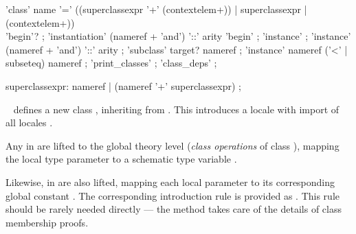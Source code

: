 \begin{isabellebody}
\begin{isamarkuptext}
  \begin{rail}
    'class' name '=' ((superclassexpr '+' (contextelem+)) | superclassexpr | (contextelem+)) \\
      'begin'?
    ;
    'instantiation' (nameref + 'and') '::' arity 'begin'
    ;
    'instance'
    ;
    'instance' (nameref + 'and') '::' arity
    ;
    'subclass' target? nameref
    ;
    'instance' nameref ('<' | subseteq) nameref
    ;
    'print\_classes'
    ;
    'class\_deps'
    ;

    superclassexpr: nameref | (nameref '+' superclassexpr)
    ;
  \end{rail}

  \begin{description}

  \item \hyperlink{command.class}{\mbox{}}~ defines
  a new class , inheriting from .  This
  introduces a locale  with import of all locales .

  Any \hyperlink{element.fixes}{\mbox{}} in  are lifted to the global
  theory level (\emph{class operations}  of class ), mapping the local type parameter
  \isa{{\isasymalpha}} to a schematic type variable .

  Likewise, \hyperlink{element.assumes}{\mbox{}} in  are also lifted,
  mapping each local parameter  to its
  corresponding global constant .  The
  corresponding introduction rule is provided as .  This rule should be rarely needed directly
  --- the \hyperlink{method.intro-classes}{\mbox{}} method takes care of the details of
  class membership proofs.


\end{description}
\end{isamarkuptext}
\end{isabellebody}
